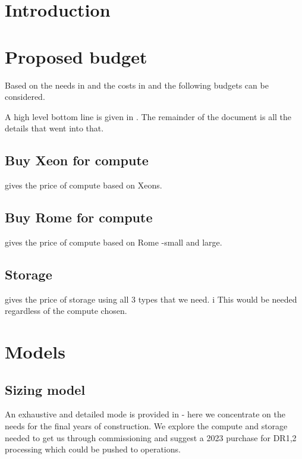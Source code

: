 \section{Introduction}



\section{Proposed budget}\label{sec:cost}
Based on the needs in  and the costs in  and 
the following budgets can be considered.

A high level bottom line is given in . The remainder of the document is all the details that went into that.



\subsection{Buy Xeon for compute} \label{sec:xeon}
 gives the price of compute based on Xeons.


\subsection{Buy Rome for compute} \label{sec:rome}
 gives the price of compute based on Rome -small and large.


\subsection{Storage} \label{sec:storagecost}
 gives the price of storage using all 3 types that we need. i
This would be needed regardless of the compute chosen.


\section{ Models}\label{sec:model}
\subsection{Sizing model}\label{sec:sizemodel}

An exhaustive and detailed mode is provided in   - here we concentrate on the needs for the
final years of construction. We explore the compute and storage needed to get us through commissioning and suggest a 2023 purchase for DR1,2 processing which could be pushed to operations.

